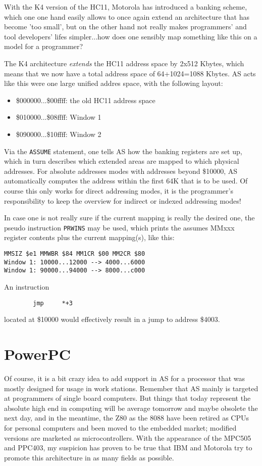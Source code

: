 \documentclass[12pt,twoside]{report}
\newcommand{\asname}{{AS}}
\begin{document}
With the K4 version  of the HC11, Motorola has introduced a banking
scheme, which one one hand easily allows to once again extend an
architecture that has become 'too small', but on the other hand not really
makes programmers' and tool developers' lifes simpler...how does one
sensibly map something like this on a model for a programmer?

The K4 architecture {\em extends} the HC11 address space by 2x512 Kbytes,
which means that we now have a total address space of 64+1024=1088 Kbytes.
\asname{} acts like this were one large unified addres space, with the following
layout:
\begin{itemize}
\item{\$000000...\$00ffff: the old HC11 address space}
\item{\$010000...\$08ffff: Window 1}
\item{\$090000...\$10ffff: Window 2}
\end{itemize}
Via the {\tt ASSUME} statement, one tells \asname{} how the banking registers are
set up, which in turn describes which extended areas are mapped to which
physical addresses.  For absolute addresses modes with addresses beyond
\$10000, \asname{} automatically computes the address within the first 64K that
is to be used.  Of course this only works for direct addressing modes, it
is the programmer's responsibility to keep the overview for indirect or
indexed addressing modes!

In case one is not really sure if the current mapping is really the
desired one, the pseudo instruction {\tt PRWINS} may be used, which prints
the assumes MMxxx register contents plus the current mapping(s), like
this:
\begin{verbatim}
MMSIZ $e1 MMWBR $84 MM1CR $00 MM2CR $80
Window 1: 10000...12000 --> 4000...6000
Window 1: 90000...94000 --> 8000...c000
\end{verbatim}
An instruction
\begin{verbatim}
        jmp     *+3
\end{verbatim}
located at \$10000 would effectively result in a jump to address \$4003.


\section{PowerPC}

Of course, it is a bit crazy idea to add support in \asname{} for a
processor that was mostly designed for usage in work stations.
Remember that \asname{} mainly is targeted at programmers of single board
computers.  But things that today represent the absolute high end in
computing will be average tomorrow and maybe obsolete the next day,
and in the meantime, the Z80 as the 8088 have been retired as CPUs
for personal computers and been moved to the embedded market;
modified versions are marketed as microcontrollers.  With the
appearance of the MPC505 and PPC403, my suspicion has proven to be
true that IBM and Motorola try to promote this architecture in as
many fields as possible.
\end{document}
